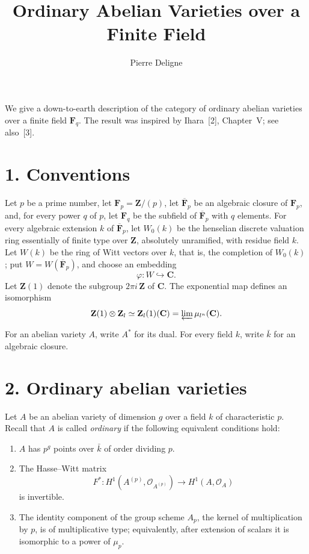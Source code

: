 \documentclass[10pt]{amsart}
\title{Ordinary Abelian Varieties over a Finite Field}
\author{Pierre Deligne}
\date{}
\theoremstyle{plain}
\theoremstyle{remark}
\begin{document}
\maketitle

We give a down-to-earth description of the category of ordinary abelian varieties over a finite field $\mathbf F_q$. The result was inspired by Ihara~[2], Chapter~V; see also~[3].

\section*{1. Conventions}
Let $p$ be a prime number, let $\mathbf F_p=\mathbf Z/(p)$, let $\overline{\mathbf F}_p$ be an algebraic closure of $\mathbf F_p$, and, for every power $q$ of $p$, let $\mathbf F_q$ be the subfield of $\overline{\mathbf F}_p$ with $q$ elements. For every algebraic extension $k$ of $\overline{\mathbf F}_p$, let $W_0(k)$ be the henselian discrete valuation ring essentially of finite type over $\mathbf Z$, absolutely unramified, with residue field $k$. Let $W(k)$ be the ring of Witt vectors over $k$, that is, the completion of $W_0(k)$; put $W=W(\overline{\mathbf F}_p)$, and choose an embedding
\[
\varphi:W\hookrightarrow \mathbf C.
\]
Let $\mathbf Z(1)$ denote the subgroup $2\pi i\,\mathbf Z$ of $\mathbf C$. The exponential map defines an isomorphism
\[
\mathbf Z(1)\otimes \mathbf Z_l\simeq \mathbf Z_l(1)(\mathbf C)=\varprojlim \mu_{l^n}(\mathbf C).
\]

For an abelian variety $A$, write $A^*$ for its dual. For every field $k$, write $\bar k$ for an algebraic closure.

\section*{2. Ordinary abelian varieties}
Let $A$ be an abelian variety of dimension $g$ over a field $k$ of characteristic $p$. Recall that $A$ is called \emph{ordinary} if the following equivalent conditions hold:
\begin{enumerate}
\item[(I)] $A$ has $p^g$ points over $\bar k$ of order dividing $p$.
\item[(II)] The Hasse--Witt matrix
\[
F^*:H^1(A^{(p)},\mathscr O_{A^{(p)}})\to H^1(A,\mathscr O_A)
\]
is invertible.
\item[(III)] The identity component of the group scheme $A_p$, the kernel of multiplication by $p$, is of multiplicative type; equivalently, after extension of scalars it is isomorphic to a power of $\mu_p$.
\end{enumerate}
\end{document}
